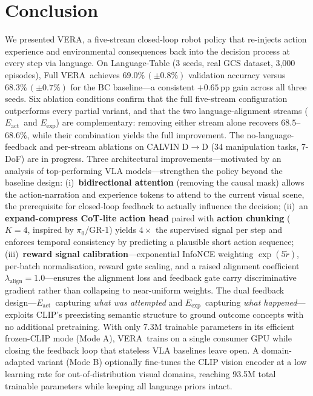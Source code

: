 \documentclass{article}
\newcommand{\modelname}{\textsc{VERA}\xspace}
\newcommand{\Lact}{$E_{\mathrm{act}}$\xspace}
\newcommand{\Lexp}{$E_{\mathrm{exp}}$\xspace}
\begin{document}
\section{Conclusion}
\label{sec:conclusion}

We presented \modelname, a five-stream closed-loop robot policy that
re-injects action experience and environmental consequences back into
the decision process at every step via language.
On Language-Table (3 seeds, real GCS dataset, 3,000 episodes), Full \modelname\
achieves $69.0\%\,(\pm0.8\%)$ validation accuracy versus $68.3\%\,(\pm0.7\%)$
for the BC baseline---a consistent $+0.65$\,pp gain across all three seeds.
Six ablation conditions confirm that the full five-stream configuration
outperforms every partial variant, and that the two language-alignment streams
(\Lact\ and \Lexp) are complementary: removing either stream alone
recovers $68.5$--$68.6\%$, while their combination yields the full improvement.
The no-language-feedback and per-stream ablations on CALVIN D$\to$D
(34 manipulation tasks, 7-DoF) are in progress.
Three architectural improvements---motivated by an analysis of top-performing
VLA models---strengthen the policy beyond the baseline design:
(i)~\textbf{bidirectional attention} (removing the causal mask) allows
the action-narration and experience tokens to attend to the current visual
scene, the prerequisite for closed-loop feedback to actually influence the
decision;
(ii)~an \textbf{expand-compress CoT-lite action head} paired with
\textbf{action chunking} ($K{=}4$, inspired by $\pi_0$/GR-1) yields
$4{\times}$ the supervised signal per step and enforces temporal
consistency by predicting a plausible short action sequence;
(iii)~\textbf{reward signal calibration}---exponential InfoNCE weighting
$\exp(5\tilde{r})$, per-batch normalisation, reward gate scaling, and
a raised alignment coefficient $\lambda_{\mathrm{align}}{=}1.0$---ensures
the alignment loss and feedback gate carry discriminative gradient rather
than collapsing to near-uniform weights.
The dual feedback design---\Lact\ capturing \emph{what was attempted} and
\Lexp\ capturing \emph{what happened}---exploits CLIP's preexisting
semantic structure to ground outcome concepts with no additional pretraining.
With only 7.3M trainable parameters in its efficient frozen-CLIP mode
(Mode A), \modelname\ trains on a single consumer GPU while closing the
feedback loop that stateless VLA baselines leave open.
A domain-adapted variant (Mode B) optionally fine-tunes the CLIP vision
encoder at a low learning rate for out-of-distribution visual domains,
reaching 93.5M total trainable parameters while keeping all language priors
intact.
\end{document}
